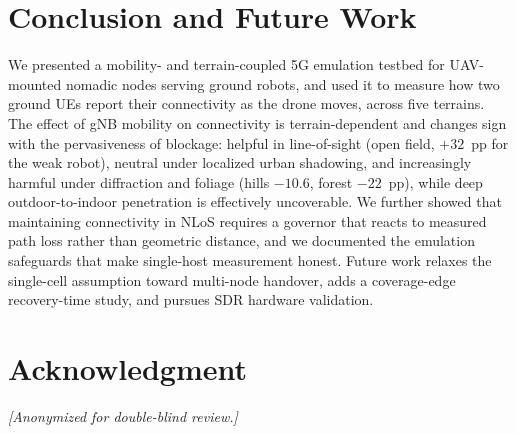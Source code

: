 \documentclass[10pt, conference]{IEEEtran}
\begin{document}
\section{Conclusion and Future Work}
\label{sec:conclusion}
We presented a mobility- and terrain-coupled 5G emulation testbed for UAV-mounted
nomadic nodes serving ground robots, and used it to measure how two ground UEs
report their connectivity as the drone moves, across five terrains. The effect of
gNB mobility on connectivity is terrain-dependent and changes sign with the
pervasiveness of blockage: helpful in line-of-sight (open field, $+32$~pp for the
weak robot), neutral under localized urban shadowing, and increasingly harmful
under diffraction and foliage (hills $-10.6$, forest $-22$~pp), while deep
outdoor-to-indoor penetration is effectively uncoverable. We further showed that
maintaining connectivity in NLoS requires a governor that reacts to measured path
loss rather than geometric distance, and we documented the emulation safeguards
that make single-host measurement honest. Future work relaxes the single-cell
assumption toward multi-node handover, adds a coverage-edge recovery-time study,
and pursues SDR hardware validation.

\section*{Acknowledgment}
\emph{[Anonymized for double-blind review.]}
\end{document}
